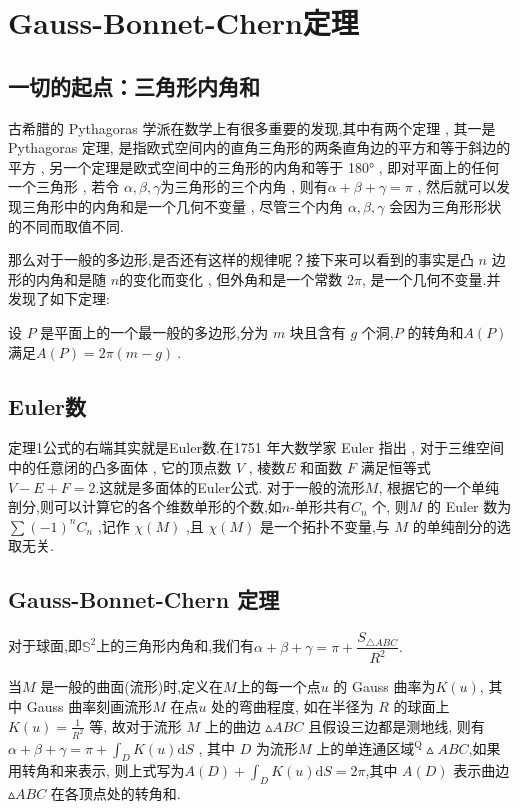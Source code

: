\documentclass[main]{subfiles}
\begin{document}
\renewcommand{\filename}{No. 27 Theorem}%
\section{Gauss-Bonnet-Chern定理}
\subsection{一切的起点：三角形内角和}
古希腊的 Pythagoras 学派在数学上有很多重要的发现,其中有两个定理 , 其一是 Pythagoras 定理,
是指欧式空间内的直角三角形的两条直角边的平方和等于斜边的平方 ,
另一个定理是欧式空间中的三角形的内角和等于 180° ,
即对平面上的任何一个三角形 , 若令 $\alpha,\beta,\gamma$为三角形的三个内角 ,
则有$\alpha+\beta+\gamma=\pi$ ,
然后就可以发现三角形中的内角和是一个几何不变量 , 尽管三个内角
$\alpha,\beta,\gamma$
会因为三角形形状的不同而取值不同.\par
那么对于一般的多边形,是否还有这样的规律呢？接下来可以看到的事实是凸 $n$
边形的内角和是随 $n$的变化而变化 , 但外角和是一个常数 $2\pi $, 是一个几何不变量.并发现了如下定理:
\begin{theorem}\label{thm:1}
	设 $P$ 是平面上的一个最一般的多边形,分为 $m$ 块且含有 $g$ 个洞,$P$ 的转角和$A(P)$ 满足$A(P)=2\pi(m-g)\:.$

\end{theorem}

\subsection{Euler数}
定理1公式的右端其实就是Euler数.在1751 年大数学家 Euler 指出 , 对于三维空间中的任意闭的凸多面体 , 它的顶点数 $V$
, 棱数$E$
和面数 $F$
满足恒等式$V-E+F=2$.这就是多面体的Euler公式.
对于一般的流形$M$, 根据它的一个单纯剖分,则可以计算它的各个维数单形的个数,如$n$-单形共有$C_n$ 个,
则$M$ 的 Euler 数为 $\displaystyle\sum(-1)^nC_n$ ,记作 $\chi(M)$ ,且 $\chi(M)$ 是一个拓扑不变量,与 $M$ 的单纯剖分的选取无关.

\subsection{Gauss-Bonnet-Chern 定理}
对于球面,即$\mathbb{S}^2$上的三角形内角和,我们有$\alpha+\beta+\gamma=\pi+\dfrac{S_{\triangle ABC}}{R^{2}}.$\par
当$M$ 是一般的曲面(流形)时,定义在$M$上的每一个点$u$ 的 Gauss 曲率为$K(u)$,
其中 Gauss 曲率刻画流形$M$ 在点$u$ 处的弯曲程度,
如在半径为 $R$ 的球面上 $K(u)=\frac1{R^2}$ 等,
故对于流形 $M$ 上的曲边 $\vartriangle ABC$ 且假设三边都是测地线,
则有 $\alpha+\beta+\gamma=\pi+\displaystyle\int_{D}K(u)\mathrm{d} S$ ,
其中 $D$ 为流形$M$ 上的单连通区域$^{\mathrm{Q}}\vartriangle ABC$,如果用转角和来表示,
则上式写为$A(D)+\displaystyle\int_DK(u)\mathrm{d}S=2\pi$,其中 $A(D)$ 表示曲边$\vartriangle ABC$ 在各顶点处的转角和.
\end{document}
